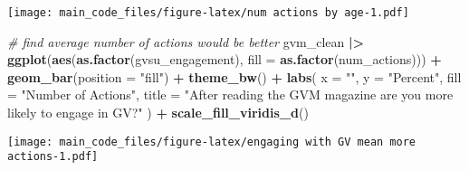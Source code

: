 \documentclass[
]{article}
\newenvironment{Shaded}{\begin{snugshade}}{\end{snugshade}}
\newcommand{\AttributeTok}[1]{\textcolor[rgb]{0.13,0.29,0.53}{#1}}
\newcommand{\CommentTok}[1]{\textcolor[rgb]{0.56,0.35,0.01}{\textit{#1}}}
\newcommand{\FunctionTok}[1]{\textcolor[rgb]{0.13,0.29,0.53}{\textbf{#1}}}
\newcommand{\NormalTok}[1]{#1}
\newcommand{\SpecialCharTok}[1]{\textcolor[rgb]{0.81,0.36,0.00}{\textbf{#1}}}
\newcommand{\StringTok}[1]{\textcolor[rgb]{0.31,0.60,0.02}{#1}}
\begin{document}
\texttt{[image: main\_code\_files/figure-latex/num actions by age-1.pdf]}

\begin{Shaded}
\begin{Highlighting}[]
\CommentTok{\# find average number of actions would be better}
\NormalTok{gvm\_clean }\SpecialCharTok{|\textgreater{}}
  \FunctionTok{ggplot}\NormalTok{(}\FunctionTok{aes}\NormalTok{(}\FunctionTok{as.factor}\NormalTok{(gvsu\_engagement), }\AttributeTok{fill =} \FunctionTok{as.factor}\NormalTok{(num\_actions))) }\SpecialCharTok{+}
  \FunctionTok{geom\_bar}\NormalTok{(}\AttributeTok{position =} \StringTok{"fill"}\NormalTok{) }\SpecialCharTok{+}
  \FunctionTok{theme\_bw}\NormalTok{() }\SpecialCharTok{+}
  \FunctionTok{labs}\NormalTok{(}
    \AttributeTok{x =} \StringTok{""}\NormalTok{,}
    \AttributeTok{y =} \StringTok{"Percent"}\NormalTok{,}
    \AttributeTok{fill =} \StringTok{"Number of Actions"}\NormalTok{,}
    \AttributeTok{title =} \StringTok{"After reading the GVM magazine are you more likely to engage in GV?"}
\NormalTok{  ) }\SpecialCharTok{+}
  \FunctionTok{scale\_fill\_viridis\_d}\NormalTok{()}
\end{Highlighting}
\end{Shaded}

\texttt{[image: main\_code\_files/figure-latex/engaging with GV mean more actions-1.pdf]}
\end{document}
